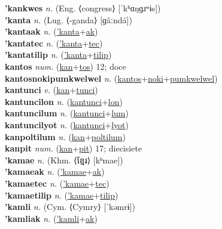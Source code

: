 \textbf{'kankwes} \textit{n.} (Eng. ⟨congress⟩ [ˈkʰɑŋɡɹʷɨs])
 \label{'kankwes} \\
\textbf{'kanta} \textit{n.} (Lug. ⟨-ganda⟩ [ɡâːndá])
 \label{'kanta} \\
\textbf{'kantaak} \textit{n.} (\hyperref['kanta]{'kanta}+\hyperref[ak]{ak})
 \label{'kantaak} \\
\textbf{'kantatec} \textit{n.} (\hyperref['kanta]{'kanta}+\hyperref[tec]{tec})
 \label{'kantatec} \\
\textbf{'kantatilip} \textit{n.} (\hyperref['kanta]{'kanta}+\hyperref[tilip]{tilip})
 \label{'kantatilip} \\
\textbf{kantos} \textit{num.} (\hyperref[kan]{kan}+\hyperref[tos]{tos})
12; doce \label{kantos} \\
\textbf{kantosnokipumkwelwel} \textit{n.} (\hyperref[kantos]{kantos}+\hyperref[noki]{noki}+\hyperref[pumkwelwel]{pumkwelwel})
 \label{kantosnokipumkwelwel} \\
\textbf{kantunci} \textit{v.} (\hyperref[kan]{kan}+\hyperref[tunci]{tunci})
 \label{kantunci} \\
\textbf{kantuncilon} \textit{n.} (\hyperref[kantunci]{kantunci}+\hyperref[lon]{lon})
 \label{kantuncilon} \\
\textbf{kantuncilum} \textit{n.} (\hyperref[kantunci]{kantunci}+\hyperref[lum]{lum})
 \label{kantuncilum} \\
\textbf{kantuncilyot} \textit{n.} (\hyperref[kantunci]{kantunci}+\hyperref[lyot]{lyot})
 \label{kantuncilyot} \\
\textbf{kanpoltilum} \textit{n.} (\hyperref[kan]{kan}+\hyperref[poltilum]{poltilum})
 \label{kanpoltilum} \\
\textbf{kanpit} \textit{num.} (\hyperref[kan]{kan}+\hyperref[pit]{pit})
17; diecisiete \label{kanpit} \\
\textbf{'kamae} \textit{n.} (Khm. ⟨ខ្មែរ⟩ [kʰmae])
 \label{'kamae} \\
\textbf{'kamaeak} \textit{n.} (\hyperref['kamae]{'kamae}+\hyperref[ak]{ak})
 \label{'kamaeak} \\
\textbf{'kamaetec} \textit{n.} (\hyperref['kamae]{'kamae}+\hyperref[tec]{tec})
 \label{'kamaetec} \\
\textbf{'kamaetilip} \textit{n.} (\hyperref['kamae]{'kamae}+\hyperref[tilip]{tilip})
 \label{'kamaetilip} \\
\textbf{'kamli} \textit{n.} (Cym. ⟨Cymry⟩ [ˈkəmrɨ])
 \label{'kamli} \\
\textbf{'kamliak} \textit{n.} (\hyperref['kamli]{'kamli}+\hyperref[ak]{ak})

